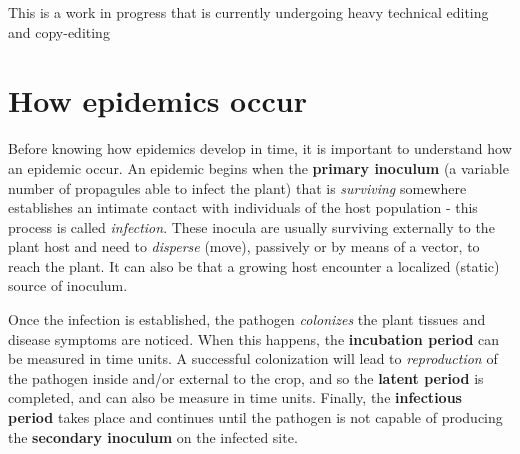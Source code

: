 \documentclass[
  letterpaper,
  DIV=11,
  numbers=noendperiod]{scrreprt}
\begin{document}
\begin{tcolorbox}[enhanced jigsaw, breakable, left=2mm, opacityback=0, rightrule=.15mm, toprule=.15mm, colframe=quarto-callout-note-color-frame, arc=.35mm, colback=white, bottomrule=.15mm, leftrule=.75mm]
\begin{minipage}[t]{5.5mm}
\textcolor{quarto-callout-note-color}{\faInfo}
\end{minipage}%
\begin{minipage}[t]{\textwidth - 5.5mm}

This is a work in progress that is currently undergoing heavy technical
editing and copy-editing

\end{minipage}%
\end{tcolorbox}

\hypertarget{how-epidemics-occur}{%
\section{How epidemics occur}\label{how-epidemics-occur}}

Before knowing how epidemics develop in time, it is important to
understand how an epidemic occur. An epidemic begins when the
\textbf{primary inoculum} (a variable number of propagules able to
infect the plant) that is \emph{surviving} somewhere establishes an
intimate contact with individuals of the host population - this process
is called \emph{infection}. These inocula are usually surviving
externally to the plant host and need to \emph{disperse} (move),
passively or by means of a vector, to reach the plant. It can also be
that a growing host encounter a localized (static) source of inoculum.

Once the infection is established, the pathogen \emph{colonizes} the
plant tissues and disease symptoms are noticed. When this happens, the
\textbf{incubation period} can be measured in time units. A successful
colonization will lead to \emph{reproduction} of the pathogen inside
and/or external to the crop, and so the \textbf{latent period} is
completed, and can also be measure in time units. Finally, the
\textbf{infectious period} takes place and continues until the pathogen
is not capable of producing the \textbf{secondary inoculum} on the
infected site.
\end{document}
